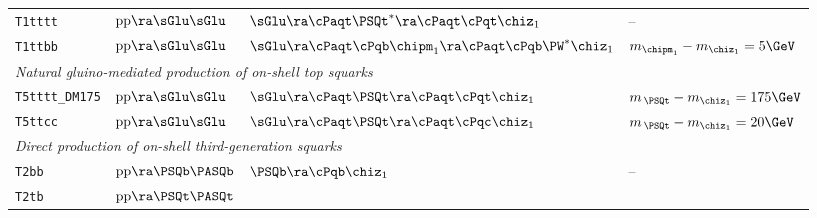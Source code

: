 \begin{table}[!b]
\begin{tabular}{ llll }
\texttt{T1tttt}        %
                                & $\text{pp}\ra\sGlu\sGlu$       
                                & $\sGlu\ra\cPaqt\PSQt^*\ra\cPaqt\cPqt\chiz_1$
                                & --                                                                             \\ [0.5ex]
\texttt{T1ttbb}        %
                                & $\text{pp}\ra\sGlu\sGlu$      
                                & $\sGlu\ra\cPaqt\cPqb\chipm_1\ra\cPaqt\cPqb\PW^*\chiz_1$
                                & $m_{\chipm_1} - m_{\chiz_1} = 5\GeV$                                           \\ [0.5ex]
\multicolumn{4}{l}{\it Natural gluino-mediated production of on-shell top squarks}                               \\ [0.5ex]
\texttt{T5tttt\_DM175}        %
                                & $\text{pp}\ra\sGlu\sGlu$      
                                & $\sGlu\ra\cPaqt\PSQt\ra\cPaqt\cPqt\chiz_1$ 
                                & $m_{\,\PSQt} - m_{\chiz_1} = 175\GeV$                                          \\ [0.5ex]
\texttt{T5ttcc}        %
                                & $\text{pp}\ra\sGlu\sGlu$       
                                & $\sGlu\ra\cPaqt\PSQt\ra\cPaqt\cPqc\chiz_1$ 
                                & $m_{\,\PSQt} - m_{\chiz_1} = 20\GeV$                                           \\ [0.5ex]
\multicolumn{4}{l}{\it Direct production of on-shell third-generation squarks}                                   \\ [0.5ex]
\texttt{T2bb}          %
                                & $\text{pp}\ra\PSQb\PASQb$     
                                & $\PSQb\ra\cPqb\chiz_1$
                                & --                                                                             \\ [0.5ex]
\texttt{T2tb}          %
                                & $\text{pp}\ra\PSQt\PASQt$     

\end{tabular}
\end{table}

